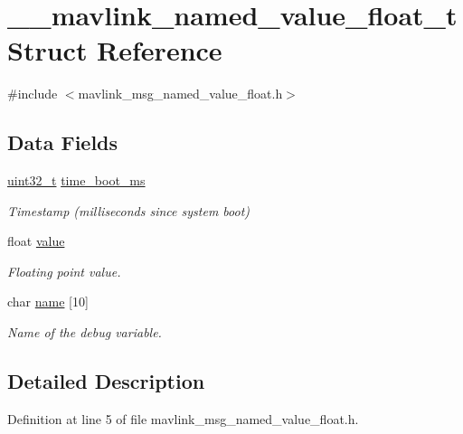\hypertarget{struct____mavlink__named__value__float__t}{\section{\-\_\-\-\_\-mavlink\-\_\-named\-\_\-value\-\_\-float\-\_\-t Struct Reference}
\label{struct____mavlink__named__value__float__t}
}


{\ttfamily \#include $<$mavlink\-\_\-msg\-\_\-named\-\_\-value\-\_\-float.\-h$>$}

\subsection*{Data Fields}
\begin{DoxyCompactItemize}
\item 
\hyperlink{stdint_8h_a435d1572bf3f880d55459d9805097f62}{uint32\-\_\-t} \hyperlink{struct____mavlink__named__value__float__t_a46e6c60e5c779ce8f3e808c485aa620f}{time\-\_\-boot\-\_\-ms}
\begin{DoxyCompactList}\small\item\em Timestamp (milliseconds since system boot) \end{DoxyCompactList}\item 
float \hyperlink{struct____mavlink__named__value__float__t_a44c8c857d4e8732bccb9ef9ed1e2a386}{value}
\begin{DoxyCompactList}\small\item\em Floating point value. \end{DoxyCompactList}\item 
char \hyperlink{struct____mavlink__named__value__float__t_a1e916005f34f9fffc7144d8b71b890d8}{name} \mbox{[}10\mbox{]}
\begin{DoxyCompactList}\small\item\em Name of the debug variable. \end{DoxyCompactList}\end{DoxyCompactItemize}


\subsection{Detailed Description}


Definition at line 5 of file mavlink\-\_\-msg\-\_\-named\-\_\-value\-\_\-float.\-h.



